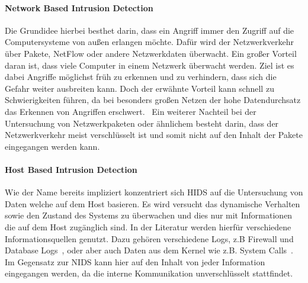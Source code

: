             \paragraph{Network Based Intrusion Detection}
                Die Grundidee hierbei besthet darin, dass ein Angriff immer den Zugriff auf die Computersysteme von außen erlangen möchte.
                Dafür wird der Netzwerkverkehr über Pakete, NetFlow oder andere Netzwerkdaten überwacht.
                Ein großer Vorteil daran ist, dass viele Computer in einem Netzwerk überwacht werden.
                Ziel ist es dabei Angriffe möglichst früh zu erkennen und zu verhindern, dass sich die Gefahr weiter ausbreiten kann.
                Doch der erwähnte Vorteil kann schnell zu Schwierigkeiten führen, da bei besonders großen Netzen der hohe Datendurchsatz das Erkennen von Angriffen erschwert.~\cite{NIDS}
                Ein weiterer Nachteil bei der Untersuchung von Netzwerkpaketen oder ähnlichem besteht darin, dass der Netzwerkverkehr meist verschlüsselt ist und somit nicht auf den Inhalt der Pakete eingegangen werden kann.

            \paragraph{Host Based Intrusion Detection}
                Wie der Name bereits impliziert konzentriert sich \ac{HIDS} auf die Untersuchung 
                von Daten welche auf dem Host basieren.
                Es wird versucht das dynamische Verhalten sowie den Zustand des Systems zu überwachen 
                und dies nur mit Informationen die auf dem Host zugänglich sind.
                In der Literatur werden hierfür verschiedene Informationsquellen genutzt.
                Dazu gehören verschiedene Logs, z.B Firewall und Database Logs~\cite{IDSsurvey},
                oder aber auch Daten aus dem Kernel wie z.B. System Calls~\cite{MAGGI}.
                Im Gegensatz zur \ac{NIDS} kann hier auf den Inhalt von jeder Information eingegangen werden,
                da die interne Kommunikation unverschlüsselt stattfindet. 

